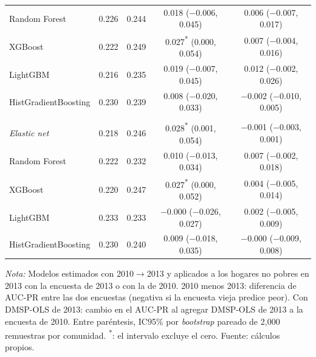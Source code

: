\begin{table}[H]
\begin{tabular}{l cc cc}
    \quad Random Forest & 0.226 & 0.244 & 0.018 ($-$0.006, 0.045) & 0.006 ($-$0.007, 0.017) \\
    \quad XGBoost & 0.222 & 0.249 & 0.027\textsuperscript{*} (0.000, 0.054) & 0.007 ($-$0.004, 0.016) \\
    \quad LightGBM & 0.216 & 0.235 & 0.019 ($-$0.007, 0.045) & 0.012 ($-$0.002, 0.026) \\
    \quad HistGradientBoosting & 0.230 & 0.239 & 0.008 ($-$0.020, 0.033) & $-$0.002 ($-$0.010, 0.005) \\
    \addlinespace
    \multicolumn{5}{l}{\textit{IPM, con ingreso y gasto (Modelo A)}} \\
    \quad \emph{Elastic net} & 0.218 & 0.246 & 0.028\textsuperscript{*} (0.001, 0.054) & $-$0.001 ($-$0.003, 0.001) \\
    \quad Random Forest & 0.222 & 0.232 & 0.010 ($-$0.013, 0.034) & 0.007 ($-$0.002, 0.018) \\
    \quad XGBoost & 0.220 & 0.247 & 0.027\textsuperscript{*} (0.000, 0.052) & 0.004 ($-$0.005, 0.014) \\
    \quad LightGBM & 0.233 & 0.233 & $-$0.000 ($-$0.026, 0.027) & 0.002 ($-$0.005, 0.009) \\
    \quad HistGradientBoosting & 0.230 & 0.240 & 0.009 ($-$0.018, 0.035) & $-$0.000 ($-$0.009, 0.008) \\
    \bottomrule
  \end{tabular}
  \begin{minipage}{0.95\textwidth}
    \vspace{4pt}
    \footnotesize \textit{Nota:} Modelos estimados con 2010$\to$2013 y aplicados a los
    hogares no pobres en 2013 con la encuesta de 2013 o con la de 2010. 2010 menos 2013:
    diferencia de AUC-PR entre las dos encuestas (negativa si la encuesta vieja predice
    peor). Con DMSP-OLS de 2013: cambio en el AUC-PR al agregar DMSP-OLS de 2013 a la
    encuesta de 2010. Entre paréntesis, IC95\% por \emph{bootstrap} pareado de 2{,}000
    remuestras por comunidad. \textsuperscript{*}: el intervalo excluye el cero.
    Fuente: cálculos propios.
  \end{minipage}
\end{table}
